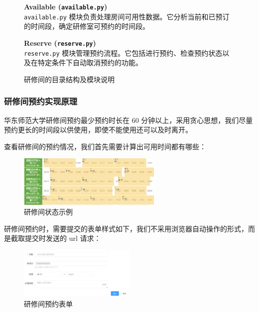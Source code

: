 \documentclass[14pt,a4paper,UTF8,twoside]{article}
\begin{document}
\begin{figure}[H]
{\begin{minipage}[H]{0.45\textwidth}
                \textbf{Available (\texttt{available.py})}\\
                \texttt{available.py} 模块负责处理房间可用性数据。它分析当前和已预订的时间段，确定研修室可预约的时间段。\\
                \vspace{0.4cm}

                \textbf{Reserve (\texttt{reserve.py})}\\
                \texttt{reserve.py} 模块管理预约流程。它包括进行预约、检查预约状态以及在特定条件下自动取消预约的功能。
            \end{minipage}
        }
        \caption{研修间的目录结构及模块说明}
        \label{fig:directory_structure}
    \end{figure}

    \subsubsection{研修间预约实现原理}

    华东师范大学研修间预约最少预约时长在 60 分钟以上，采用贪心思想，我们尽量预约更长的时间段以供使用，即使不能使用还可以及时离开。

    查看研修间的预约情况，我们首先需要计算出可用时间都有哪些：

    \begin{figure}[H]
        \centering
        \includegraphics[width=0.62\textwidth]{img/studyroom_state.png}
        \caption{研修间状态示例}
        \label{fig:studyroom_available}
    \end{figure}

    研修间预约时，需要提交的表单样式如下，我们不采用浏览器自动操作的形式，而是截取提交时发送的 url 请求：

    \begin{figure}[H]
        \centering
        \includegraphics[width=0.5\textwidth]{img/studyroom_submit.png}
        \caption{研修间预约表单}
        \label{fig:studyroom_reserve}
    \end{figure}
\end{document}
